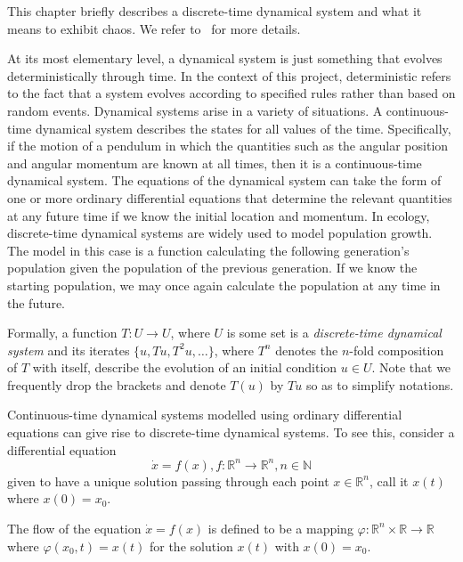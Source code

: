 This chapter briefly describes a discrete-time dynamical system and what it means to exhibit chaos. We refer to~\cite{devaney2018introduction, de2013elements} for more details. 

At its most elementary level, a dynamical system is just something that evolves deterministically through time. In the context of this project, deterministic refers to the fact that a system evolves according to specified rules rather than based on random events. 
Dynamical systems arise in a variety of situations. A continuous-time dynamical system describes the states for all values of the time. Specifically, if the motion of a pendulum in which the quantities such as the angular position and angular momentum are known at all times, then it is a continuous-time dynamical system. The equations of the dynamical system can take the form of one or more ordinary differential equations that determine the relevant quantities at any future time if we know the initial location and momentum. 
In ecology, discrete-time dynamical systems are widely used to model population growth. The model in this case is a function calculating the following generation's population given the population of the previous generation. If we know the starting population, we may once again calculate the population at any time in the future. 

Formally, a function $T: U \to U$, where $U$ is some set is  a \emph{discrete-time dynamical system} and its iterates $\{u,Tu,T^2u,\ldots\}$, where $T^n$ denotes the $n$-fold composition of $T$ with itself, describe the evolution of an initial condition $u\in U$. Note that we frequently drop the brackets and denote $T(u)$ by $Tu$ so as to simplify notations.  





Continuous-time dynamical systems modelled using ordinary differential equations can give rise to discrete-time dynamical systems. To see this, consider a differential equation 
\[\dot{x} = f(x), f: \mathbb{R}^n \to \mathbb{R}^n, n\in\mathbb{N}\]
  given to have a unique solution passing through 
each point $x\in\mathbb{R}^{n}$, call it $x(t)$ where $x(0)=x_0$. 

\begin{Definition}
  \label{Dfn_Flow}\rm
  The flow of the equation  $\dot{x} = f(x)$  is defined to be a mapping $\varphi: \mathbb{R}^n \times \mathbb{R} \to \mathbb{R}$ where $\varphi(x_0,t)= x(t)$ for the solution $x(t)$ with $x(0)=x_0$.
\end{Definition}

